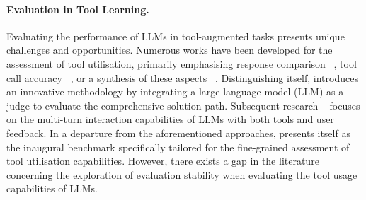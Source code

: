 \paragraph{Evaluation in Tool Learning.}
Evaluating the performance of LLMs in tool-augmented tasks presents unique challenges and opportunities.
Numerous works have been developed for the assessment of tool utilisation, primarily emphasising response comparison ~\citep{zhuang2023toolqa}, tool call accuracy ~\citep{patil2023gorilla}, or a synthesis of these aspects ~\citep{li2023apibank}. Distinguishing itself, \cite{qin2023toolllm} introduces an innovative methodology by integrating a large language model (LLM) as a judge to evaluate the comprehensive solution path. 
Subsequent research ~\citep{wang2023mint} focuses on the multi-turn interaction capabilities of LLMs with both tools and user feedback.
In a departure from the aforementioned approaches, \cite{chen2023teval} presents itself as the inaugural benchmark specifically tailored for the fine-grained assessment of tool utilisation capabilities.
However, there exists a gap in the literature concerning the exploration of evaluation stability when evaluating the tool usage capabilities of LLMs.




